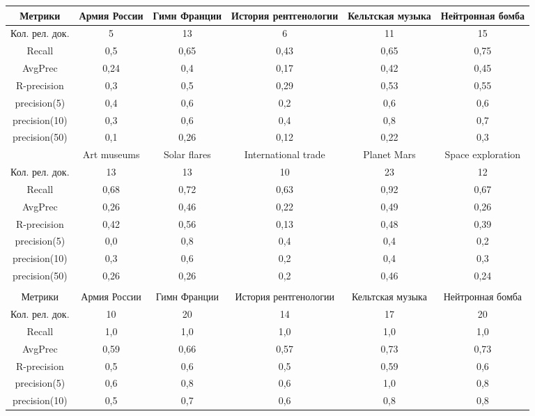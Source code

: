 \begin{table}[ht]
\begin{adjustbox}{width=0.9\textwidth}
\begin{tabular}{| c | c | c | c | c | c |}
			\hline
			Метрики & Армия России & Гимн Франции & История рентгенологии &  Кельтская музыка &  Нейтронная бомба \\
			\hline
			Кол. рел. док. & 5 & 13 & 6 & 11 & 15  \\
			\hline
			Recall & 0,5 & 0,65 & 0,43 & 0,65 & 0,75 \\
			\hline
			AvgPrec & 0,24 & 0,4 & 0,17 & 0,42 & 0,45  \\
			\hline
			R-precision & 0,3 & 0,5 & 0,29 & 0,53 & 0,55  \\
			\hline
			precision(5) & 0,4 & 0,6 & 0,2 & 0,6 & 0,6  \\
			\hline
			precision(10) & 0,3 & 0,6 & 0,4 & 0,8 & 0,7  \\
			\hline
			precision(50) & 0,1 & 0,26 & 0,12 & 0,22 & 0,3  \\
			\hline
			& Art museums & Solar flares & International trade &  Planet Mars &  Space exploration \\
			\hline
			Кол. рел. док. & 13 & 13 & 10 & 23 & 12  \\
			\hline
			Recall & 0,68 & 0,72 & 0,63 & 0,92 & 0,67 \\
			\hline
			AvgPrec & 0,26 & 0,46 & 0,22 & 0,49 & 0,26  \\
			\hline
			R-precision & 0,42 & 0,56 & 0,13 & 0,48 & 0,39  \\
			\hline
			precision(5) & 0,0 & 0,8 & 0,4 & 0,4 & 0,2  \\
			\hline
			precision(10) & 0,3 & 0,6 & 0,2 & 0,4 & 0,3  \\
			\hline
			precision(50) & 0,26 & 0,26 & 0,2 & 0,46 & 0,24  \\
			\hline
			\\
			\hline
			Метрики & Армия России & Гимн Франции & История рентгенологии &  Кельтская музыка &  Нейтронная бомба \\
			\hline
			Кол. рел. док. & 10 & 20 & 14 & 17 & 20  \\
			\hline
			Recall & 1,0 & 1,0 & 1,0 & 1,0 & 1,0 \\
			\hline
			AvgPrec & 0,59 & 0,66 & 0,57 & 0,73 & 0,73  \\
			\hline
			R-precision & 0,5 & 0,6 & 0,5 & 0,59 & 0,6  \\
			\hline
			precision(5) & 0,6 & 0,8 & 0,6 & 1,0 & 0,8  \\
			\hline
			precision(10) & 0,5 & 0,7 & 0,6 & 0,8 & 0,8  \\

\end{tabular}
\end{adjustbox}
\end{table}
